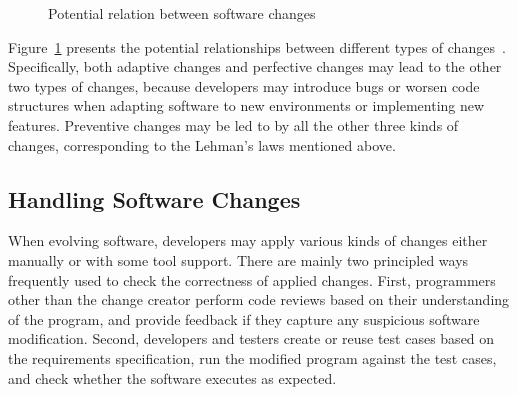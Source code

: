 \documentclass[runningheads,a4paper]{llncs}
\begin{document}
\begin{figure}[!htb]
\centering
{}
\caption{Potential relation between software changes~\cite{Seaman2008:SMC}}
\label{fig:relation}
\end{figure}

Figure~\ref{fig:relation} presents the potential relationships between different types of changes~\cite{Seaman2008:SMC}. Specifically, both adaptive changes and perfective changes may lead to the other two types of changes, because developers may introduce bugs or worsen code structures when adapting software to new environments or implementing new features. Preventive changes may be led to by all the other three kinds of changes, corresponding to the Lehman's laws mentioned above.

\subsection{Handling Software Changes}

When evolving software, developers may apply various kinds of changes either manually or with some tool support. There are mainly two principled ways frequently used to check the correctness of applied changes. First, programmers other than the change creator perform code reviews based on their understanding of the program, and provide feedback if they capture any suspicious software modification. Second, developers and testers create or reuse test cases based on the requirements specification, run the modified program against the test cases, and check whether the software executes as expected.  
\end{document}

